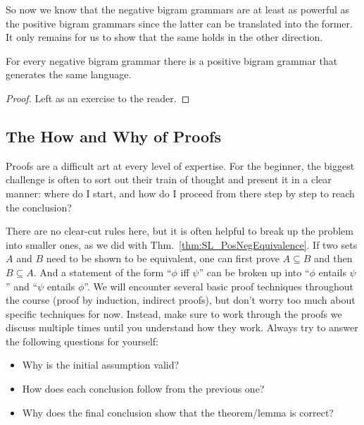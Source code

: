 So now we know that the negative bigram grammars are at least as powerful as the positive bigram grammars since the latter can be translated into the former.
It only remains for us to show that the same holds in the other direction.

\begin{lemma}
    For every negative bigram grammar there is a positive bigram grammar that generates the same language.
\end{lemma}
%
\begin{proof}
    Left as an exercise to the reader.
\end{proof}

\subsection{The How and Why of Proofs}

Proofs are a difficult art at every level of expertise.
For the beginner, the biggest challenge is often to sort out their train of thought and present it in a clear manner: where do I start, and how do I proceed from there step by step to reach the conclusion?

There are no clear-cut rules here, but it is often helpful to break up the problem into smaller ones, as we did with Thm.~\ref{thm:SL_PosNegEquivalence}.
If two sets $A$ and $B$ need to be shown to be equivalent, one can first prove $A \subseteq B$ and then $B \subseteq A$.
And a statement of the form ``$\phi$ iff $\psi$'' can be broken up into ``$\phi$ entails $\psi$'' and ``$\psi$ entails $\phi$''.
We will encounter several basic proof techniques throughout the course (proof by induction, indirect proofs), but don't worry too much about specific techniques for now.
Instead, make sure to work through the proofs we discuss multiple times until you understand how they work.
Always try to answer the following questions for yourself:

\begin{itemize}
    \item Why is the initial assumption valid?
    \item How does each conclusion follow from the previous one?
    \item Why does the final conclusion show that the theorem\slash lemma is correct?
\end{itemize}

